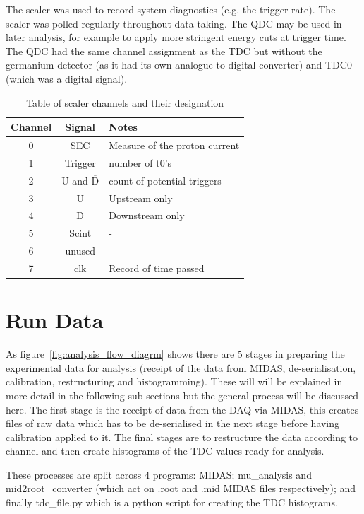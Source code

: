 \documentclass[]{article}
\begin{document}
The scaler was used to record system diagnostics (e.g. the trigger rate). The scaler was polled regularly throughout data taking. The QDC may be used in later analysis, for example to apply more stringent energy cuts at trigger time. The QDC had the same channel assignment as the TDC but without the germanium detector (as it had its own analogue to digital converter) and TDC0 (which was a digital signal).
\begin{table}
    \centering
    \begin{tabular}{c|c|l}
        Channel & Signal & Notes\\
        \hline
        0 & SEC & Measure of the proton current\\
        1 & Trigger & number of t0's\\
        2 & U and $\overline{\text{D}}$ & count of potential triggers\\
        3 & U & Upstream only\\
        4 & D & Downstream only\\
        5 & Scint & -\\
        6 & unused & -\\
        7 & clk & Record of time passed\\
    \end{tabular}
    \caption{Table of scaler channels and their designation}
    \label{tab:scaler_chs}
\end{table}

\section{Run Data} %
\label{sec:run_data}
As figure~\ref{fig:analysis_flow_diagrm} shows there are 5 stages in preparing the experimental data for analysis (receipt of the data from MIDAS, de-serialisation, calibration, restructuring and histogramming). These will will be explained in more detail in the following sub-sections but the general process will be discussed here. The first stage is the receipt of data from the DAQ via MIDAS, this creates files of raw data which has to be de-serialised in the next stage before having calibration applied to it. The final stages are to restructure the data according to channel and then create histograms of the TDC values ready for analysis. 

These processes are split across 4 programs: MIDAS; mu\_analysis and mid2root\_converter (which act on .root and .mid MIDAS files respectively); and finally tdc\_file.py which is a python script for creating the TDC histograms.
\end{document}
